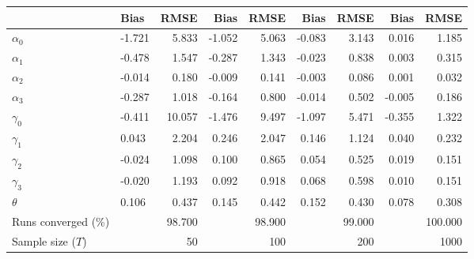 
\begin{tabular}[t]{llrrrrrrr}
\toprule
  & Bias & RMSE & Bias & RMSE & Bias & RMSE & Bias & RMSE\\
\midrule
$\alpha_{0}$ & -1.721 & 5.833 & -1.052 & 5.063 & -0.083 & 3.143 & 0.016 & 1.185\\
$\alpha_{1}$ & -0.478 & 1.547 & -0.287 & 1.343 & -0.023 & 0.838 & 0.003 & 0.315\\
$\alpha_{2}$ & -0.014 & 0.180 & -0.009 & 0.141 & -0.003 & 0.086 & 0.001 & 0.032\\
$\alpha_{3}$ & -0.287 & 1.018 & -0.164 & 0.800 & -0.014 & 0.502 & -0.005 & 0.186\\
$\gamma_{0}$ & -0.411 & 10.057 & -1.476 & 9.497 & -1.097 & 5.471 & -0.355 & 1.322\\
$\gamma_{1}$ & 0.043 & 2.204 & 0.246 & 2.047 & 0.146 & 1.124 & 0.040 & 0.232\\
$\gamma_{2}$ & -0.024 & 1.098 & 0.100 & 0.865 & 0.054 & 0.525 & 0.019 & 0.151\\
$\gamma_{3}$ & -0.020 & 1.193 & 0.092 & 0.918 & 0.068 & 0.598 & 0.010 & 0.151\\
$\theta$ & 0.106 & 0.437 & 0.145 & 0.442 & 0.152 & 0.430 & 0.078 & 0.308\\
Runs converged (\%) &  & 98.700 &  & 98.900 &  & 99.000 &  & 100.000\\
Sample size ($T$) &  & 50 &  & 100 &  & 200 &  & 1000\\
\bottomrule
\end{tabular}
